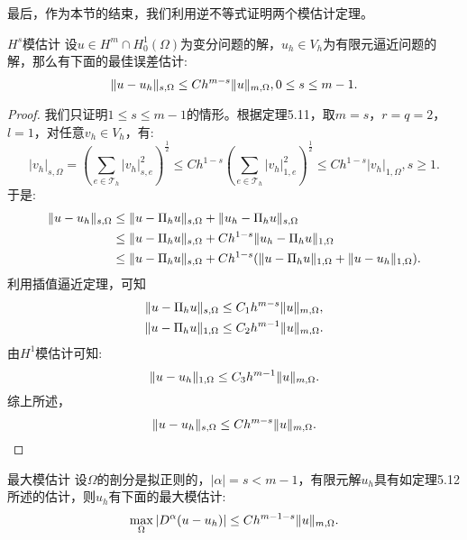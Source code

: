 最后，作为本节的结束，我们利用逆不等式证明两个模估计定理。
\begin{theorem}{$H^{s}$模估计}
    设$u\in H^{m}\cap H_{0}^{1}(\Omega)$为变分问题的解，$u_{h}\in V_{h}$为有限元逼近问题的解，那么有下面的最佳误差估计:
    \begin{equation}
        \|u-u_{h}\|_{s,\Omega}\le Ch^{m-s}\|u\|_{m,\Omega},0\le s\le m-1.
    \end{equation}
\end{theorem}
\begin{proof}
    我们只证明$1\le s\le m-1$的情形。根据定理5.11，取$m=s$，$r=q=2$，$l=1$，对任意$v_{h}\in V_{h}$，有:
    \begin{equation}
        |v_{h}|_{s,\Omega}=\left(\sum_{e\in\mathcal{T}_{h}}|v_{h}|_{s,e}^{2}\right)^{\frac{1}{2}}\le Ch^{1-s}\left(\sum_{e\in\mathcal{T}_{h}}|v_{h}|_{1,e}^{2}\right)^{\frac{1}{2}}\le Ch^{1-s}|v_{h}|_{1,\Omega},s\ge 1.
    \end{equation}
    于是:
    \begin{equation}
        \begin{aligned}
            \|u-u_{h}\|_{s,\Omega}&\le\|u-\Pi_{h}u\|_{s,\Omega}+\|u_{h}-\Pi_{h}u\|_{s,\Omega}\\
            &\le\|u-\Pi_{h}u\|_{s,\Omega}+Ch^{1-s}\|u_{h}-\Pi_{h}u\|_{1,\Omega}\\
            &\le\|u-\Pi_{h}u\|_{s,\Omega}+Ch^{1-s}(\|u-\Pi_{h}u\|_{1,\Omega}+\|u-u_{h}\|_{1,\Omega}).
        \end{aligned}
    \end{equation}
    利用插值逼近定理，可知
    \begin{equation}
        \begin{aligned}
            \|u-\Pi_{h}u\|_{s,\Omega}&\le C_{1}h^{m-s}\|u\|_{m,\Omega},\\
            \|u-\Pi_{h}u\|_{1,\Omega}&\le C_{2}h^{m-1}\|u\|_{m,\Omega}.
        \end{aligned}
    \end{equation}
    由$H^{1}$模估计可知:
    \begin{equation}
        \|u-u_{h}\|_{1,\Omega}\le C_{3}h^{m-1}\|u\|_{m,\Omega}.
    \end{equation}
    综上所述，
    \begin{equation}
        \|u-u_{h}\|_{s,\Omega}\le Ch^{m-s}\|u\|_{m,\Omega}.
    \end{equation}
\end{proof}
\begin{theorem}{最大模估计}
    设$\Omega$的剖分是拟正则的，$|\alpha|=s<m-1$，有限元解$u_{h}$具有如定理5.12所述的估计，则$u_{h}$有下面的最大模估计:
    \begin{equation}
        \max_{\Omega}|D^{\alpha}(u-u_{h})|\le Ch^{m-1-s}\|u\|_{m,\Omega}.
    \end{equation}
\end{theorem}
